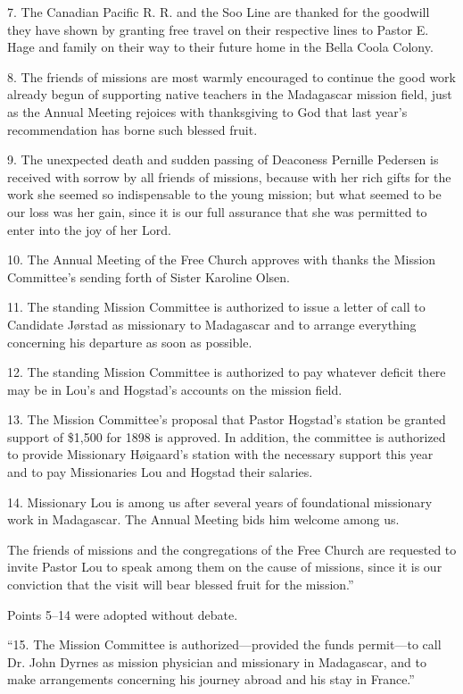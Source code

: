 7. The Canadian Pacific R. R. and the Soo Line are thanked for the goodwill they have shown by granting free travel on their respective lines to Pastor E. Hage and family on their way to their future home in the Bella Coola Colony.

8. The friends of missions are most warmly encouraged to continue the good work already begun of supporting native teachers in the Madagascar mission field, just as the Annual Meeting rejoices with thanksgiving to God that last year’s recommendation has borne such blessed fruit.

9. The unexpected death and sudden passing of Deaconess Pernille Pedersen is received with sorrow by all friends of missions, because with her rich gifts for the work she seemed so indispensable to the young mission; but what seemed to be our loss was her gain, since it is our full assurance that she was permitted to enter into the joy of her Lord.

10. The Annual Meeting of the Free Church approves with thanks the Mission Committee’s sending forth of Sister Karoline Olsen.

11. The standing Mission Committee is authorized to issue a letter of call to Candidate Jørstad as missionary to Madagascar and to arrange everything concerning his departure as soon as possible.

12. The standing Mission Committee is authorized to pay whatever deficit there may be in Lou’s and Hogstad’s accounts on the mission field.

13. The Mission Committee’s proposal that Pastor Hogstad’s station be granted support of \$1,500 for 1898 is approved. In addition, the committee is authorized to provide Missionary Høigaard’s station with the necessary support this year and to pay Missionaries Lou and Hogstad their salaries.

14. Missionary Lou is among us after several years of foundational missionary work in Madagascar. The Annual Meeting bids him welcome among us.

The friends of missions and the congregations of the Free Church are requested to invite Pastor Lou to speak among them on the cause of missions, since it is our conviction that the visit will bear blessed fruit for the mission.”

Points 5–14 were adopted without debate.

“15. The Mission Committee is authorized—provided the funds permit—to call Dr. John Dyrnes as mission physician and missionary in Madagascar, and to make arrangements concerning his journey abroad and his stay in France.”

